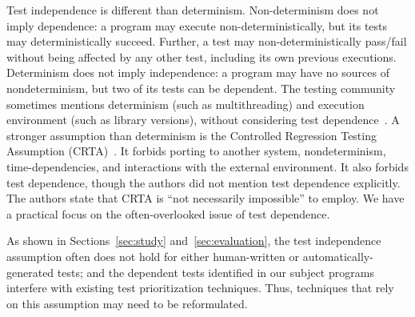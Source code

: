 Test independence is different than determinism.
%
Non-determinism does not imply dependence:  a program may execute
non-deterministically, but its tests may deterministically succeed.
Further, a test may non-deterministically pass/fail without being
affected by any other test, including its own previous executions.
%
Determinism does not imply independence:  a program may have no sources of
nondeterminism, but two of its tests can be dependent.
%
The testing community sometimes mentions determinism (such as
multithreading) and execution environment (such as library
versions), without considering test dependence~\cite{Orso:2004:SRT}.
%
A stronger assumption than determinism is the Controlled Regression
Testing Assumption (CRTA)~\cite{Rothermel:1996:ART}.  It forbids porting to another system,
nondeterminism, time-dependencies, and interactions with the external
environment.  It also forbids test dependence, though the authors did not
mention test dependence explicitly.  The authors state that CRTA is ``not
necessarily impossible'' to employ.  We have a practical focus on the
often-overlooked issue of test dependence.

As shown in Sections~\ref{sec:study} and~\ref{sec:evaluation},
the test independence assumption often does not hold for either
human-written or automatically-generated tests; and the dependent
tests identified in our subject programs interfere with
existing test prioritization techniques. Thus, techniques
that rely on this assumption may need to be reformulated.

\begin{comment}
Most automated test generation
techniques~\cite{PachecoLET2007, Wang:2007:AGC,
ZhangSBE2011} do not take test dependence
into consideration. As shown in our experiments
(Section~\ref{sec:evaluation}) and previous work~\cite{RobinsonEPAL2011},
a large number of tests generated by Randoop are dependent.
We speculate that these dependences arise because automated
test generators generally create new tests
based on the program state after executing the previous test,
for the sake of test diversity and efficiency. 
When Randoop generates a nondeterministic test, it can disable the test but
leave it in the suite where it is executed in order to prevent other tests
that are dependent on it from beginning to fail~\cite{RobinsonEPAL2011}.
Exploring how to incorporate test dependence into the design of an automated
test generator is future work.
\end{comment}

